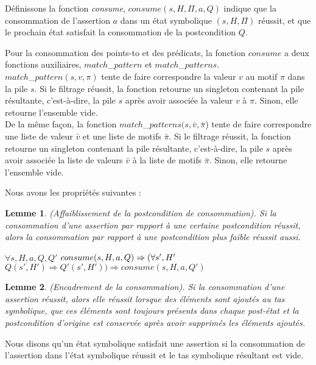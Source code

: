 \documentclass[11pt,openany]{article}
\newtheorem{lemme}{Lemme}
\begin{document}
	D\'efinissons la fonction \textit{consume}, $consume(s,H,\Pi,a,Q)$ indique que la consommation de l'assertion $a$ dans un \'etat symbolique $(s,H,\Pi)$ r\'eussit, et que le prochain \'etat satisfait la consommation de la postcondition $Q$.
	
	Pour la consommation des points-to et des pr\'edicats, la fonction $consume$ a deux fonctions auxiliaires, $match$_$pattern$ et $match$_$patterns$.\\ $match$_$pattern(s,v,\pi)$ tente de faire correspondre la valeur $v$ au motif $\pi$ dans la pile $s$. Si le filtrage r\'eussit, la fonction retourne un singleton contenant la pile r\'esultante, c'est-\`a-dire, la pile $s$ apr\`es avoir associ\'ee la valeur $v$ \`a $\pi$. Sinon, elle retourne l'ensemble vide.\\
	De la m\^eme fa\c{c}on, la fonction $match$_$patterns(s,\bar{v},\bar{\pi}$) tente de faire correspondre une liste de valeur $\bar{v}$ et une liste de motifs $\bar{\pi}$. Si le filtrage r\'eussit, la fonction retourne un singleton contenant la pile r\'esultante, c'est-\`a-dire, la pile $s$ apr\`es avoir associ\'ee la liste de valeurs $\bar{v}$ \`a la liste de motifs $\bar{\pi}$. Sinon, elle retourne l'ensemble vide.
	
	Nous avons les propri\'et\'es suivantes :	
	
	\begin{lemme}
		(Affaiblissement de la postcondition de consommation). Si la consommation d'une assertion par rapport \`a une certaine postcondition  r\'eussit, alors la consommation par rapport \`a une postcondition plus faible r\'eussit aussi.
		
$\forall s,H,a,Q,Q'$ $consume(s,H,a,Q)\Rightarrow\\(\forall s', H'$ $Q(s',H')\Rightarrow Q'(s',H'))\Rightarrow consume(s,H,a,Q')$
	\end{lemme}
	
	\begin{lemme}
		(Encadrement de la consommation). Si la consommation d'une assertion r\'eussit, alors elle r\'eussit lorsque des \'el\'ements sont ajout\'es au tas symbolique, que ces \'el\'ements sont toujours pr\'esents dans chaque post-\'etat et la postcondition d'origine est conserv\'ee apr\`es avoir supprim\'es les \'el\'ements ajout\'es.
	\end{lemme}
	Nous disons qu'un \'etat symbolique satisfait une assertion si la consommation de l'assertion dans l'\'etat symbolique r\'eussit et le tas symbolique r\'esultant est vide.\\
	
\end{document}
